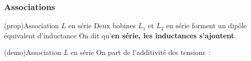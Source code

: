 \documentclass[../../main/main.tex]{subfiles}
\begin{document}
\subsubsection{Associations}
\begin{tcb*}[label=prop:bserie, sidebyside, righthand ratio=.4]
	(prop){Association $L$ en série}
	Deux bobines $L_1$ et $L_2$ en série forment un dipôle équivalent
	d'inductance
	\psw{%
		\[
			\boxed{L\ind{eq} = L_1 + L_2}
		\]
	}%
	On dit qu'\textbf{en série, les inductances s'ajoutent}.
	\tcblower
	\vspace{-10pt}
	\begin{center}
		\vspace{-10pt}
	\end{center}
\end{tcb*}
\begin{tcb*}[label=demo:bserie](demo){Association $L$ en série}
	On part de l'additivité des tensions~:
\end{tcb*}
\end{document}
